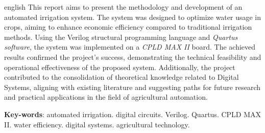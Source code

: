 \documentclass[
	article,			%
	11pt,				%
	oneside,			%
	a4paper,			%
	english,			%
	brazil,				%
	sumario=tradicional
	]{abntex2}
\begin{document}
\emptythanks
\maketitle

\renewcommand{\resumoname}{Abstract}
\begin{resumoumacoluna}
 \begin{otherlanguage*}{english}
   This report aims to present the methodology and development of an automated irrigation system. The system was designed to optimize water usage in crops, aiming to enhance economic efficiency compared to traditional irrigation methods. Using the Verilog structural programming language and \textit{Quartus software}, the system was implemented on a \textit{CPLD MAX II} board. The achieved results confirmed the project's success, demonstrating the technical feasibility and operational effectiveness of the proposed system. Additionally, the project contributed to the consolidation of theoretical knowledge related to Digital Systems, aligning with existing literature and suggesting paths for future research and practical applications in the field of agricultural automation.

   \vspace{\onelineskip}
 
   \noindent
   \textbf{Key-words}: automated irrigation. digital circuits. Verilog. Quartus. CPLD MAX II. water efficiency. digital systems. agricultural technology.






 \end{otherlanguage*}  
\end{resumoumacoluna}



\end{document}
